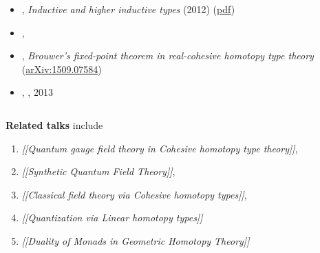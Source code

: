 \documentclass[12pt,titlepage]{article}
\theoremstyle{plain}
\theoremstyle{definition}
\theoremstyle{remark}
\begin{document}
\begin{itemize}
\item {}, \emph{Inductive and higher inductive types} (2012) (\href{http://www.math.ias.edu/~mshulman/hottminicourse2012/04induction.pdf}{pdf})


\item {}, \emph{}


\item {}, \emph{Brouwer's fixed-point theorem in real-cohesive homotopy type theory} (\href{http://arxiv.org/abs/1509.07584}{arXiv:1509.07584})


\item {}, \emph{}, 2013



\end{itemize}
$\,$

\textbf{Related talks} include

\begin{enumerate}%
\item \emph{[[Quantum gauge field theory in Cohesive homotopy type theory]]},


\item \emph{[[Synthetic Quantum Field Theory]]},


\item \emph{[[Classical field theory via Cohesive homotopy types]]},


\item \emph{[[Quantization via Linear homotopy types]]}


\item \emph{[[Duality of Monads in Geometric Homotopy Theory]]}



\end{enumerate}
\end{document}
